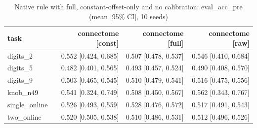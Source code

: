 \begin{table}[t]
\centering
\small
\begin{tabular}{lrrr}
\toprule
task & connectome [const] & connectome [full] & connectome [raw] \\
\midrule
digits\_2 & 0.552 [0.424, 0.685] & 0.507 [0.478, 0.537] & 0.546 [0.410, 0.684] \\
digits\_5 & 0.482 [0.401, 0.565] & 0.493 [0.457, 0.524] & 0.490 [0.408, 0.570] \\
digits\_9 & 0.503 [0.465, 0.545] & 0.510 [0.479, 0.541] & 0.516 [0.475, 0.556] \\
knob\_n49 & 0.541 [0.324, 0.749] & 0.508 [0.450, 0.567] & 0.562 [0.343, 0.767] \\
single\_online & 0.526 [0.493, 0.559] & 0.528 [0.476, 0.572] & 0.517 [0.491, 0.543] \\
two\_online & 0.520 [0.505, 0.538] & 0.510 [0.486, 0.531] & 0.512 [0.496, 0.526] \\
\bottomrule
\end{tabular}
\caption{Native rule with full, constant-offset-only and no calibration: eval\_acc\_pre (mean [95\% CI], 10 seeds)}
\label{tab:nocalib_eval_acc_pre}
\end{table}